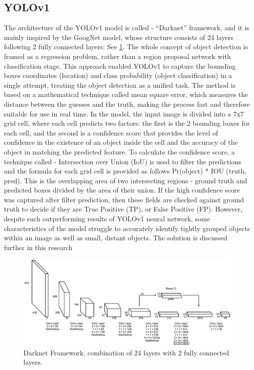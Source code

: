 \begin{multicols}{2}
\subsection{YOLOv1}
The architecture of the YOLOv1 model is called - “Darknet” framework, and it is mainly inspired by the GoogNet model, whose structure consists of 24 layers following 2 fully connected layers: See \ref{fig:Darknet Framework}. The whole concept of object detection is framed as a regression problem, rather than a region proposal network with classification stage. This approach enabled YOLOv1 to capture the bounding boxes coordinates (location) and class probability (object classification) in a single attempt, treating the object detection as a unified task. The method is based on a mathematical technique called mean square error, which measures the distance between the guesses and the truth, making the process fast and therefore suitable for use in real time. In the model, the input image is divided into a 7x7 grid cell, where each cell predicts two factors: the first is the 2 bounding boxes for each cell, and the second is a confidence score that provides the level of confidence in the existence of an object inside the cell and the accuracy of the object in matching the predicted feature. To calculate the confidence score, a technique called - Intersection over Union (IoU) is used to filter the predictions and the formula for each grid cell is provided as follows Pr(object) * IOU (truth, pred). This is the overlapping area of two intersecting regions - ground truth and predicted boxes divided by the area of their union. If the high confidence score was captured after filter prediction, then these fields are checked against ground truth to decide if they are True Positive (TP), or False Positive (FP). However, despite such outperforming results of YOLOv1 neural network, some characteristics of the model struggle to accurately identify tightly grouped objects within an image as well as small, distant objects. The solution is discussed further in this research
\end{multicols}

\begin{figure}[ht]
    \centering
    \includegraphics[width=0.9\linewidth]{datas/Darknet Framework.png}
    \caption{Darknet Framework, combination of 24 layers with 2 fully connected layers.}
    \label{fig:Darknet Framework}
\end{figure}

